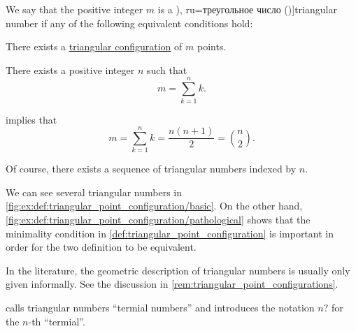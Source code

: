 \begin{definition}\label{def:triangular_number}
  We say that the positive integer \( m \) is a \term[en=triangular number (\cite[1]{Deza2012FigurateNumbers}), ru=треугольное число (\cite[14]{Розенфельд1963ОсновныеПонятиеГеометрии})]{triangular number} if any of the following equivalent conditions hold:
  \begin{thmenum}
     There exists a \hyperref[def:triangular_point_configuration]{triangular configuration} of \( m \) points.

     There exists a positive integer \( n \) such that
    \begin{equation}\label{eq:def:triangular_number/arithmetic}
      m = \sum_{k=1}^n k.
    \end{equation}
  \end{thmenum}
\end{definition}
\begin{comments}
  \item {} implies that
  \begin{equation*}
    m = \sum_{k=1}^n k = \frac {n(n + 1)} 2 = \binom n 2.
  \end{equation*}

  \item Of course, there exists a sequence of triangular numbers indexed by \( n \).

  \item We can see several triangular numbers in \cref{fig:ex:def:triangular_point_configuration/basic}. On the other hand, \cref{fig:ex:def:triangular_point_configuration/pathological} shows that the minimality condition in \cref{def:triangular_point_configuration} is important in order for the two definition to be equivalent.

  \item In the literature, the geometric description of triangular numbers is usually only given informally. See the discussion in \cref{rem:triangular_point_configurations}.

  \item {} calls triangular numbers \enquote{termial numbers} and introduces the notation \( n? \) for the \( n \)-th \enquote{termial}.
\end{comments}
